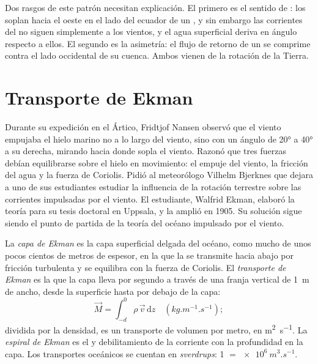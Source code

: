 Dos rasgos de este patrón necesitan explicación. El primero es el sentido de : los  soplan hacia el oeste en el lado del ecuador de un , y sin embargo las corrientes del  no siguen simplemente a los vientos, y el agua superficial deriva en ángulo respecto a ellos. El segundo es la asimetría: el flujo de retorno de un  se comprime contra el lado occidental de su cuenca. Ambos vienen de la rotación de la Tierra.

\section{Transporte de Ekman}\label{sec:b1:ocean-circulation:ekman}

\begin{history}
Durante su expedición en el Ártico, Fridtjof Nansen observó que el viento empujaba el hielo marino no a lo largo del viento, sino con un ángulo de \ang{20} a \ang{40} a su derecha, mirando hacia donde sopla el viento. Razonó que tres fuerzas debían equilibrarse sobre el hielo en movimiento: el empuje del viento, la fricción del agua y la fuerza de Coriolis. Pidió al meteorólogo Vilhelm Bjerknes que dejara a uno de sus estudiantes estudiar la influencia de la rotación terrestre sobre las corrientes impulsadas por el viento. El estudiante, Walfrid Ekman, elaboró la teoría para su tesis doctoral en Uppsala, y la amplió en 1905. Su solución sigue siendo el punto de partida de la teoría del océano impulsado por el viento.
\end{history}

\begin{definition}\label{def:b1:ocean-circulation:ekman}
La \emph{capa de Ekman} es la capa superficial delgada del océano, como mucho de unos pocos cientos de metros de espesor, en la que la  se transmite hacia abajo por fricción turbulenta y se equilibra con la fuerza de Coriolis. El \emph{transporte de
Ekman} es la  que la capa lleva por segundo a través de una franja vertical de \qty{1}{m} de ancho, desde la superficie hasta por debajo de la capa:
\[
  \vec M = \int_{-d}^{0} \rho\,\vec v\,\mathrm dz \quad (\unit{kg.m^{-1}.s^{-1}});
\]
dividida por la densidad, es un transporte de volumen por metro, en
\unit{m^2.s^{-1}}. La \emph{espiral de Ekman} es el  y debilitamiento de la corriente con la profundidad en la capa. Los transportes oceánicos se cuentan en \emph{sverdrups}: \qty{1}{\sverdrup} $=
\qty{e6}{m^3.s^{-1}}$.
\end{definition}

